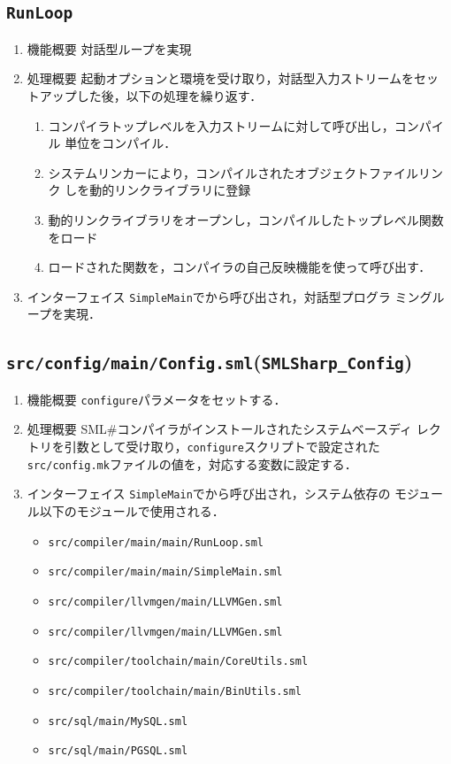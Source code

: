 \documentclass{jbook}
\newcommand{\smlsharp}{SML\#}
\newcommand{\code}[1]{\mbox{\large\tt #1}}
\newcommand{\module}[2]{\code{#1}(\code{#2})}
\begin{document}
\subsection{\code{RunLoop}}
\begin{enumerate}
\item 機能概要 対話型ループを実現
\item 処理概要 起動オプションと環境を受け取り，対話型入力ストリームをセッ
トアップした後，以下の処理を繰り返す．
\begin{enumerate}
\item コンパイラトップレベルを入力ストリームに対して呼び出し，コンパイル
単位をコンパイル．
\item システムリンカーにより，コンパイルされたオブジェクトファイルリンク
しを動的リンクライブラリに登録
\item 動的リンクライブラリをオープンし，コンパイルしたトップレベル関数
をロード
\item ロードされた関数を，コンパイラの自己反映機能を使って呼び出す．
\end{enumerate}
\item インターフェイス \code{SimpleMain}でから呼び出され，対話型プログラ
ミングループを実現．
\end{enumerate}

\subsection{\module{src/config/main/Config.sml}{SMLSharp\_Config}}
\begin{enumerate}
\item 機能概要 \code{configure}パラメータをセットする．
\item 処理概要 \smlsharp{}コンパイラがインストールされたシステムベースディ
レクトリを引数として受け取り，\code{configure}スクリプトで設定された
\code{src/config.mk}ファイルの値を，対応する変数に設定する．
\item インターフェイス \code{SimpleMain}でから呼び出され，システム依存の
モジュール以下のモジュールで使用される．
\begin{itemize}
\item \code{src/compiler/main/main/RunLoop.sml}
\item \code{src/compiler/main/main/SimpleMain.sml}
\item \code{src/compiler/llvmgen/main/LLVMGen.sml}
\item \code{src/compiler/llvmgen/main/LLVMGen.sml}
\item \code{src/compiler/toolchain/main/CoreUtils.sml}
\item \code{src/compiler/toolchain/main/BinUtils.sml}
\item \code{src/sql/main/MySQL.sml}
\item \code{src/sql/main/PGSQL.sml}
\end{itemize}
\end{enumerate}
\end{document}
